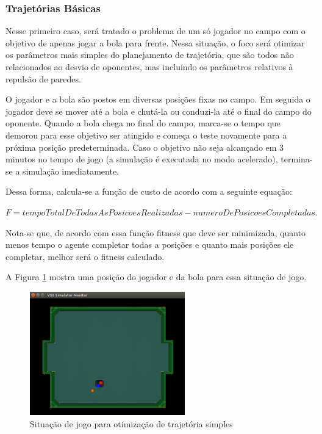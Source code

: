 \documentclass[10pt,fleqn,a4paper]{article}
\begin{document}
\subsubsection{Trajetórias Básicas}

Nesse primeiro caso, será tratado o problema de um só jogador no campo com o objetivo de apenas jogar a bola para frente. Nessa situação, o foco será otimizar os parâmetros mais simples do planejamento de trajetória, que são todos não relacionados ao desvio de oponentes, mas incluindo os parâmetros relativos à repulsão de paredes.

O jogador e a bola são postos em diversas posições fixas no campo. Em seguida o jogador deve se mover até a bola e chutá-la ou conduzi-la até o final do campo do oponente. Quando a bola chega no final do campo, marca-se o tempo que demorou para esse objetivo ser atingido e começa o teste novamente para a próxima posição predeterminada. Caso o objetivo não seja alcançado em 3 minutos no tempo de jogo (a simulação é executada no modo acelerado), termina-se a simulação imediatamente.

Dessa forma, calcula-se a função de custo de acordo com a seguinte equação:

$ F = tempoTotalDeTodasAsPosicoesRealizadas - numeroDePosicoesCompletadas. $
 
Nota-se que, de acordo com essa função fitness que deve ser minimizada, quanto menos tempo o agente completar todas a posições e quanto mais posições ele completar, melhor será o fitness calculado.

A Figura \ref{fig:sem_obstaculo_simulacao} mostra uma posição do jogador e da bola para essa situação de jogo.

\begin{figure}[H]
	\centering
	\includegraphics[width=0.6\textwidth]{figures/OtimizacaoSemObstaculoSimulacao.png}
	\caption{Situação de jogo para otimização de trajetória simples}
	\label{fig:sem_obstaculo_simulacao}
\end{figure}
\end{document}

